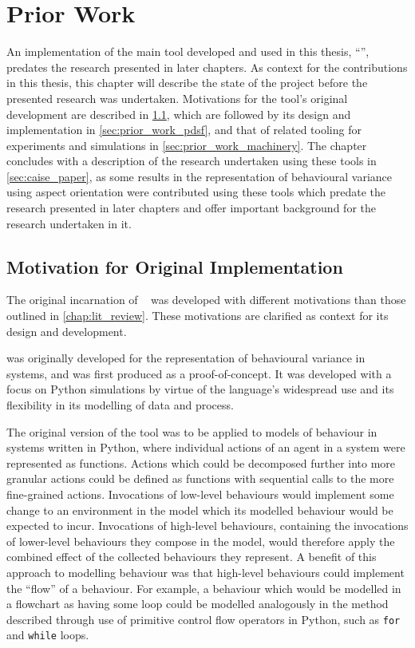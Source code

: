 \chapter{Prior Work}\label{chap:prior_work}


An implementation of the main tool developed and used in this thesis,
``\pdsf{}'', predates the research presented in later chapters. As context for
the contributions in this thesis, this chapter will describe the state of the
project before the presented research was undertaken. Motivations for the tool's
original development are described in \cref{sec:pdsf_motivations}, which are
followed by its design and implementation in \cref{sec:prior_work_pdsf}, and
that of related tooling for experiments and simulations in
\cref{sec:prior_work_machinery}. The chapter concludes with a description of the
research undertaken using these tools in \cref{sec:caise_paper}, as some results
in the representation of behavioural variance using aspect orientation were
contributed using these tools which predate the research presented in later
chapters and offer important background for the research undertaken in it.

\section{Motivation for Original Implementation}\label{sec:pdsf_motivations}

The original incarnation of \pdsf{}~\cite{wallis2018caise} was developed with
different motivations than those outlined in \cref{chap:lit_review}. These
motivations are clarified as context for its design and
development.

\pdsf{} was originally developed for the representation of behavioural variance
in \sociotechnical systems, and was first produced as a proof-of-concept. It was
developed with a focus on Python simulations by virtue of the language's widespread
use and its flexibility in its modelling of data and process.

The original version of the tool was to be applied to models of behaviour in
\sociotechnical systems written in Python, where individual actions of an agent
in a system were represented as functions. Actions which could be decomposed
further into more granular actions could be defined as functions with sequential
calls to the more fine-grained actions. Invocations of low-level
behaviours would implement some change to an environment in the model which its
modelled behaviour would be expected to incur. Invocations of high-level
behaviours, containing the invocations of lower-level behaviours they compose in
the model, would therefore apply the combined effect of the collected behaviours
they represent. A benefit of this approach to modelling behaviour was that
high-level behaviours could implement the ``flow'' of a behaviour. For example,
a behaviour which would be modelled in a flowchart as having some loop could be
modelled analogously in the method described through use of primitive control
flow operators in Python, such as \lstinline{for} and \lstinline{while} loops.

